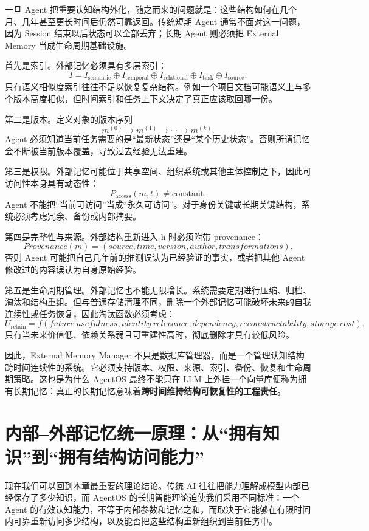 一旦 Agent 把重要认知结构外化，随之而来的问题就是：这些结构如何在几个月、几年甚至更长时间后仍然可靠返回。传统短期 Agent 通常不面对这一问题，因为 Session 结束以后状态可以全部丢弃；长期 Agent 则必须把 External Memory 当成生命周期基础设施。

首先是索引。外部记忆必须具有多层索引：
\[
I
=
I_{\mathrm{semantic}}
\oplus
I_{\mathrm{temporal}}
\oplus
I_{\mathrm{relational}}
\oplus
I_{\mathrm{task}}
\oplus
I_{\mathrm{source}}.
\]
只有语义相似度索引往往不足以恢复复杂结构。例如一个项目文档可能语义上与多个版本高度相似，但时间索引和任务上下文决定了真正应该取回哪一份。

第二是版本。定义对象的版本序列
\[
m^{(0)}
\rightarrow
m^{(1)}
\rightarrow
\cdots
\rightarrow
m^{(k)}.
\]
Agent 必须知道当前任务需要的是``最新状态''还是``某个历史状态''。否则所谓记忆会不断被当前版本覆盖，导致过去经验无法重建。

第三是权限。外部记忆可能位于共享空间、组织系统或其他主体控制之下，因此可访问性本身具有动态性：
\[
P_{\mathrm{access}}(m,t)
\neq
\mathrm{constant}.
\]
Agent 不能把``当前可访问''当成``永久可访问''。对于身份关键或长期关键结构，系统必须考虑冗余、备份或内部摘要。

第四是完整性与来源。外部结构重新进入 h 时必须附带 provenance：
\[
Provenance(m)
=
(source,
time,
version,
author,
transformations).
\]
否则 Agent 可能把自己几年前的推测误认为已经验证的事实，或者把其他 Agent 修改过的内容误认为自身原始经验。

第五是生命周期管理。外部记忆也不能无限增长。系统需要定期进行压缩、归档、淘汰和结构重组。但与普通存储清理不同，删除一个外部记忆可能破坏未来的自我连续性或任务恢复，因此淘汰函数必须考虑：
\[
U_{\mathrm{retain}}
=
f(
future\ usefulness,
identity\ relevance,
dependency,
reconstructability,
storage\ cost).
\]
只有当未来价值低、依赖关系弱且可重建性高时，彻底删除才具有较低风险。

因此，External Memory Manager 不只是数据库管理器，而是一个管理认知结构跨时间连续性的系统。它必须支持版本、权限、来源、索引、备份、恢复和生命周期策略。这也是为什么 AgentOS 最终不能只在 LLM 上外挂一个向量库便称为拥有长期记忆：真正的长期记忆意味着\textbf{跨时间维持结构可恢复性的工程责任}。

\section{内部--外部记忆统一原理：从“拥有知识”到“拥有结构访问能力”}

现在我们可以回到本章最重要的理论结论。传统 AI 往往把能力理解成模型内部已经保存了多少知识，而 AgentOS 的长期智能理论迫使我们采用不同标准：一个 Agent 的有效认知能力，不等于内部参数和记忆之和，而取决于它能够在有限时间内可靠重新访问多少结构，以及能否把这些结构重新组织到当前任务中。

